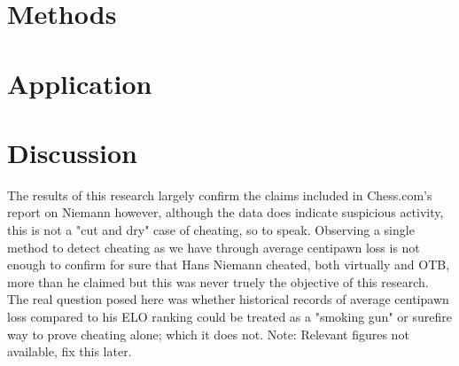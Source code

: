 \documentclass[12pt, letterpaper, titlepage]{article}
\begin{document}
\section*{Methods}
\label{sec:sim}


\section*{Application}
\label{sec:app}


\section*{Discussion}
\label{sec:disc}

The results of this research largely confirm the claims included in Chess.com's report on Niemann however, although the data does indicate suspicious activity, this is not a "cut and dry" case of cheating, so to speak. Observing a single method to detect cheating as we have through average centipawn loss is not enough to confirm for sure that Hans Niemann cheated, both virtually and OTB, more than he claimed but this was never truely the objective of this research. The real question posed here was whether historical records of average centipawn loss compared to his ELO ranking could be treated as a "smoking gun" or surefire way to prove cheating alone; which it does not. Note: Relevant figures not available, fix this later. 



\end{document}
